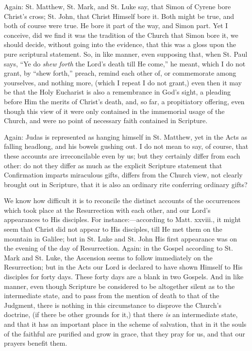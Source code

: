 Again: St. Matthew, St. Mark, and St. Luke say, that Simon of
Cyrene bore Christ's cross; St. John, that Christ Himself bore it.
Both might be true, and both of course were true. He bore it part of
the way, and Simon part. Yet I conceive, did we find it was the
tradition of the Church that Simon bore it, we should decide, without
going into the evidence, that this was a gloss upon the pure
scriptural statement. So, in like manner, even supposing that, when
St. Paul says, ``Ye do \emph{shew forth} the Lord's death till He
come,'' he meant, which I do not grant, by ``shew forth,''
preach, remind each other of, or commemorate among yourselves, and
nothing more, (which I repeat I do not grant,) even then it may be
that the Holy Eucharist is also a remembrance in God's sight, a
pleading before Him the merits of Christ's death, and, so far, a
propitiatory offering, even though this view of it were only contained
in the immemorial usage of the Church, and were no point of necessary
faith contained in Scripture.

Again: Judas is represented as hanging himself in St. Matthew, yet
in the Acts as falling headlong, and his bowels gushing out. I do not
mean to say, of course, that these accounts are irreconcilable even by
us; but they certainly differ from each other: do not they differ as
much as the explicit Scripture statement that Confirmation imparts
miraculous gifts, differs from the Church view, not clearly brought
out in Scripture, that it is also an ordinary rite conferring ordinary
gifts?

We know how difficult it is to reconcile the distinct accounts of
the occurrences which took place at the Resurrection with each other,
and our Lord's appearances to His disciples. For instance:—according
to Matt. xxviii., it might seem that Christ did not appear to His
disciples, till He met them on the mountain in Galilee; but in St.
Luke and St. John His first appearance was on the evening of the day
of Resurrection. Again: in the Gospel according to St. Mark and St.
Luke, the Ascension seems to follow immediately on the Resurrection;
but in the Acts our Lord is declared to have shown Himself to His
disciples for forty days. These forty days are a blank in two Gospels.
And in like manner, even though Scripture be considered to be
altogether silent as to the intermediate state, and to pass from the
mention of death to that of the Judgment, there is nothing in this
circumstance to disprove the Church's doctrine, (if there be other
grounds for it,) that there \emph{is} an intermediate state, and that it has
an important place in the scheme of salvation, that in it the souls of
the faithful are purified and grow in grace, that they pray for us,
and that our prayers benefit them.

